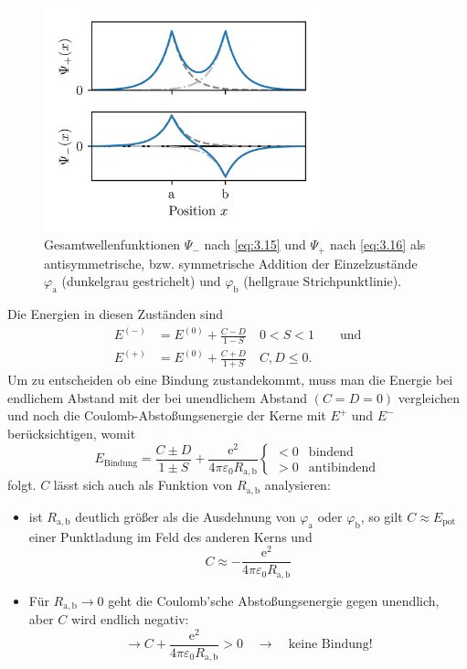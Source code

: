     \begin{figure}[H]
        \centering
        \includegraphics[width=8cm]{figures/vl04/wavefn_Psi_plus_minus.png}
        \caption{Gesamtwellenfunktionen $\Psi_-$ nach \eqref{eq:3.15} und $\Psi_+$ nach \eqref{eq:3.16} als antisymmetrische, bzw. symmetrische Addition der Einzelzustände $\varphi_\mathrm a$ (dunkelgrau gestrichelt) und $\varphi_\mathrm b$ (hellgraue Strichpunktlinie).}
        \label{fig:I.3_wavefn_Psi_plus_minus}
    \end{figure}

    Die Energien in diesen Zuständen sind
    \begin{align}
        \label{eq:3.17}
        E^{(-)} &= E^{(0)} + \frac{C-D}{1-S} \quad 0 < S < 1\qquad\text{und} \\
        \label{eq:3.18}
        E^{(+)} &= E^{(0)} + \frac{C+D}{1+S}\quad C, D \le 0.
    \end{align}
    Um zu entscheiden ob eine Bindung zustandekommt, muss man die Energie bei endlichem Abstand mit der bei unendlichem Abstand $\left( C= D = 0 \right) $ vergleichen und noch die Coulomb-Abstoßungsenergie der Kerne mit $ E^{+}$ und $E^{-}$ berücksichtigen, womit 
    $$
    E_{\text{Bindung}} = \frac{C \pm D}{1 \pm S} + \frac{\mathrm{e}^2}{4 \pi \varepsilon_0 R_\mathrm{a,b}}
    \begin{cases}
        < 0 &\text{bindend}\\
        > 0 &\text{antibindend}
    \end{cases}
    $$ 
    folgt. $C$ lässt sich auch als Funktion von $R_\mathrm{a,b}$ analysieren:
    \begin{itemize}
        \item ist $R_\mathrm{a,b}$ deutlich größer als die Ausdehnung von $ \varphi_\mathrm{a}$ oder $ \varphi_\mathrm{b}$, so gilt $C \approx E_{\text{pot}}$ einer Punktladung im Feld des anderen Kerns und
            $$
            C \approx - \frac{\mathrm{e}^2}{4 \pi \varepsilon_0 R_\mathrm{a,b}}
            $$
        \item Für $R_\mathrm{a,b}\to 0$ geht die Coulomb'sche Abstoßungsenergie gegen unendlich, aber $C$ wird endlich negativ:
            $$
            \to C + \frac{\mathrm{e}^2}{4\pi \varepsilon_0 R_\mathrm{a,b}}>0 \quad \to \quad \text{keine Bindung!}
            $$ 
    \end{itemize}

